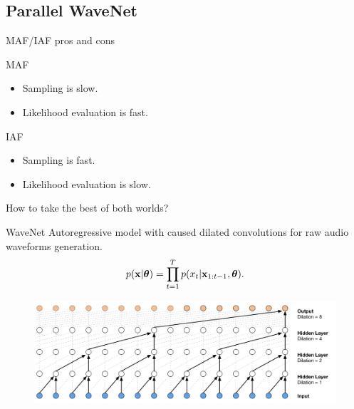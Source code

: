 \documentclass{beamer}
\begin{document}
\subsection{Parallel WaveNet}
\begin{frame}{MAF/IAF pros and cons}
	\begin{minipage}{0.50\columnwidth}
		\begin{block}{MAF}
			\begin{itemize}
				\item Sampling is slow.
				\item Likelihood evaluation is fast.
			\end{itemize}
		\end{block}
	\end{minipage}%
	\begin{minipage}{0.51\columnwidth}
		\begin{block}{IAF}
			\begin{itemize}
				\item Sampling is fast.
				\item Likelihood evaluation is slow.
			\end{itemize}
		\end{block}
	\end{minipage}
	How to take the best of both worlds?
	\begin{block}{WaveNet}
		Autoregressive model with caused dilated convolutions for raw audio waveforms generation.
		\vspace{-0.5cm}
		\[
			p(\mathbf{x}| \boldsymbol{\theta}) = \prod_{t=1}^T p(x_t|\mathbf{x}_{1:t-1}, \boldsymbol{\theta}).
		\]
		\vspace{-0.7cm}
		\begin{figure}
			\centering
			\includegraphics[width=0.85\linewidth]{figs/wavenet2.png}
		\end{figure}
	\end{block}
\end{frame}
\end{document}
